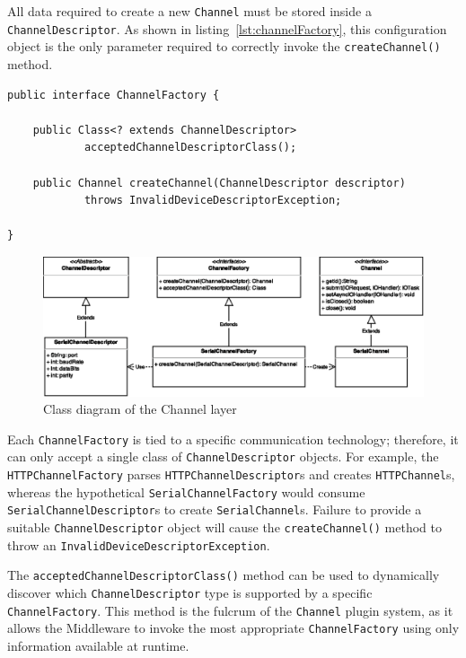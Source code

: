 All data required to create a new \texttt{Channel} must be stored inside a \texttt{ChannelDescriptor}. As shown in listing~\ref{lst:channelFactory}, this configuration object is the only parameter required to correctly invoke the \texttt{createChannel()} method.

\lstset{language=Java}
\begin{lstlisting}[float,caption=The ChannelFactory interface,label={lst:channelFactory}]
public interface ChannelFactory {

	public Class<? extends ChannelDescriptor>
			acceptedChannelDescriptorClass();

	public Channel createChannel(ChannelDescriptor descriptor)
			throws InvalidDeviceDescriptorException;

}
\end{lstlisting}

\begin{figure}[h!]
\includegraphics[width=\textwidth]{imgs/channel_factory.eps}
\caption{Class diagram of the Channel layer}
\end{figure}

Each \texttt{ChannelFactory} is tied to a specific communication technology; therefore, it can only accept a single class of \texttt{ChannelDescriptor} objects. For example, the \texttt{HTTPChannelFactory} parses \texttt{HTTPChannelDescriptor}s and creates \texttt{HTTPChannel}s, whereas the hypothetical \texttt{SerialChannelFactory} would consume \texttt{SerialChannelDescriptor}s to create \texttt{SerialChannel}s. Failure to provide a suitable \texttt{ChannelDescriptor} object will cause the \texttt{createChannel()} method to throw an \texttt{InvalidDeviceDescriptorException}.

The \texttt{acceptedChannelDescriptorClass()} method can be used to dynamically discover which \texttt{ChannelDescriptor} type is supported by a specific \texttt{ChannelFactory}. This method is the fulcrum of the \texttt{Channel} plugin system, as it allows the Middleware to invoke the most appropriate \texttt{ChannelFactory} using only information available at runtime.

